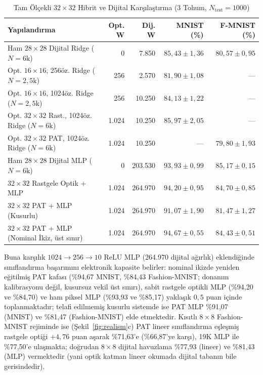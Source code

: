\documentclass[journal]{IEEEtran}
\begin{document}
\begin{table}[!t]
  \centering
  \caption{Tam \"Ol\c{c}ekli $32\times 32$ Hibrit ve Dijital Kar\c{s}\i{}la\c{s}t\i{}rma (3 Tohum, $N_{\mathrm{test}}=1000$)}
  \label{tab:scaling}
  \begin{tabular}{@{}lrrrr@{}}
    \toprule
    \textbf{Yap\i{}land\i{}rma} & \textbf{Opt. W} & \textbf{Dij. W} & \textbf{MNIST (\%)} & \textbf{F-MNIST (\%)} \\
    \midrule
    Ham $28\times 28$ Dijital Ridge ($N=6\text{k}$) & 0 & 7.850 & $85{,}43 \pm 1{,}36$ & $80{,}57 \pm 0{,}95$ \\
    Opt. $16\times 16$, 256\"oz. Ridge ($N=2{,}5\text{k}$) & 256 & 2.570 & $81{,}90 \pm 1{,}08$ & --- \\
    Opt. $16\times 16$, 1024\"oz. Ridge ($N=2{,}5\text{k}$) & 256 & 10.250 & $84{,}13 \pm 1{,}22$ & --- \\
    Opt. $32\times 32$ Rast., 1024\"oz. Ridge ($N=6\text{k}$) & 1.024 & 10.250 & $85{,}97 \pm 2{,}05$ & --- \\
    Opt. $32\times 32$ PAT, 1024\"oz. Ridge ($N=6\text{k}$) & 1.024 & 10.250 & --- & $79{,}80 \pm 1{,}93$ \\
    \midrule
    Ham $28\times 28$ Dijital MLP ($N=6\text{k}$) & 0 & 203.530 & $93{,}93 \pm 0{,}99$ & $85{,}17 \pm 0{,}15$ \\
    $32\times 32$ Rastgele Optik + MLP & 1.024 & 264.970 & $94{,}20 \pm 0{,}95$ & $84{,}70 \pm 0{,}85$ \\
    $32\times 32$ PAT + MLP (Kusurlu) & 1.024 & 264.970 & $91{,}07 \pm 1{,}90$ & $81{,}47 \pm 1{,}27$ \\
    $32\times 32$ PAT + MLP (Nominal \.{I}kiz, \"ust s\i{}n\i{}r) & 1.024 & 264.970 & $94{,}67 \pm 0{,}55$ & $84{,}43 \pm 0{,}51$ \\
    \bottomrule
  \end{tabular}
\end{table}

Buna kar\c{s}\i{}l\i{}k $1024\to 256\to 10$ ReLU MLP (264.970 dijital a\u{g}\i{}rl\i{}k) eklendi\u{g}inde s\i{}n\i{}fland\i{}rma ba\c{s}ar\i{}m\i{}n\i{} elektronik kapasite belirler: nominal ikizde yeniden e\u{g}itilmi\c{s} PAT kafas\i{} (\%94,67 MNIST, \%84,43 Fashion-MNIST; donan\i{}m kalibrasyonu de\u{g}il, kusursuz vekil \"ust s\i{}n\i{}r\i{}), sabit rastgele optikli MLP (\%94,20 ve \%84,70) ve ham piksel MLP (\%93,93 ve \%85,17) yakla\c{s}\i{}k $0{,}5$ puan i\c{c}inde toplanmaktad\i{}r; telafi edilmemi\c{s} kusurlu sistemde ise PAT MLP \%91,07 (MNIST) ve \%81,47 (Fashion-MNIST) elde etmektedir. K\i{}s\i{}tl\i{} $8\times 8$ Fashion-MNIST rejiminde ise (\c{S}ekil~\ref{fig:realism}c) PAT lineer s\i{}n\i{}fland\i{}rma e\c{s}le\c{s}mi\c{s} rastgele opti\u{g}i $+4{,}76$ puan a\c{s}arak \%71,63'e (\%66,87'ye kar\c{s}\i{}), 19K MLP ile \%77,50'e ula\c{s}makta; do\u{g}rudan $8\times 8$ dijital havuzlama \%77,93 (lineer) ve \%81,43 (MLP) vermektedir (yani optik katman lineer okumada dijital taban\i{}n bile gerisindedir).
\end{document}
